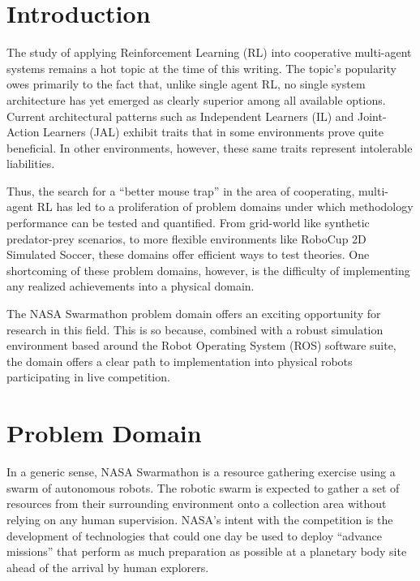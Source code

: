 \documentclass[sigconf,authordraft]{acmart}
\begin{document}
\maketitle

\section{Introduction}\label{sec:intro}
The study of applying Reinforcement Learning (RL) into cooperative multi-agent
systems remains a hot topic at the time of this writing. The topic's popularity
owes primarily to the fact that, unlike single agent RL, no single system
architecture has yet emerged as clearly superior among all available options.
Current architectural patterns such as Independent Learners (IL) and
Joint-Action Learners (JAL) exhibit traits that in some environments prove
quite beneficial. In other environments, however, these same traits represent
intolerable liabilities.

Thus, the search for a ``better mouse trap'' in the area of cooperating,
multi-agent RL has led to a proliferation of problem domains under which
methodology performance can be tested and quantified. From grid-world like
synthetic predator-prey scenarios, to more flexible environments like RoboCup
2D Simulated Soccer, these domains offer efficient ways to test theories. One
shortcoming of these problem domains, however, is the difficulty of implementing
any realized achievements into a physical domain.

The NASA Swarmathon problem domain offers an exciting opportunity for research
in this field. This is so because, combined with a robust simulation environment
based around the Robot Operating System (ROS) software suite, the domain offers
a clear path to implementation into physical robots participating in live
competition.

\section{Problem Domain}\label{sec:prob_domain}
In a generic sense, NASA Swarmathon is a resource gathering exercise using a
swarm of autonomous robots. The robotic swarm is expected to gather a set of
resources from their surrounding environment onto a collection area without
relying on any human supervision. NASA's intent with the competition is the
development of technologies that could one day be used to deploy ``advance
missions'' that perform as much preparation as possible at a planetary body site ahead of the arrival by human explorers.
\end{document}
